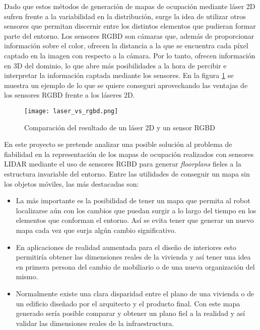 Dado que estos métodos de generación de mapas de ocupación mediante láser 2D sufren frente a la variabilidad en la distribución, surge la idea de utilizar otros sensores que permitan discernir entre los distintos elementos que pudieran formar parte del entorno. Los sensores RGBD son cámaras que, además de proporcionar información sobre el color, ofrecen la distancia a la que se encuentra cada píxel captado en la imagen con respecto a la cámara. Por lo tanto, ofrecen información en 3D del dominio, lo que abre más posibilidades a la hora de percibir e interpretar la información captada mediante los sensores. En la figura \ref{fig:laser_vs_rgbd} se muestra un ejemplo de lo que se quiere conseguri aprovechando las ventajas de los sensores RGBD frente a los láseres 2D.\\

\begin{figure}[H]
	\begin{center} 
	\texttt{[image: laser\_vs\_rgbd.png]}
	\end{center}
	\caption{Comparación del resultado de un láser 2D y un sensor RGBD}
	\label{fig:laser_vs_rgbd}
\end{figure}

En este proyecto se pretende analizar una posible solución al problema de fiabilidad en la representación de los mapas de ocupación realizados con sensores LIDAR mediante el uso de sensores RGBD para generar \textit{floorplans} fieles a la estructura invariable del entorno. Entre las utilidades de conseguir un mapa sin los objetos móviles, las más destacadas son:

\begin{itemize}

	\item La más importante es la posibilidad de tener un mapa que permita al robot localizarse aún con los cambios que puedan surgir a lo largo del tiempo en los elementos que conforman el entorno. Así se evita tener que generar un nuevo mapa cada vez que surja algún cambio significativo.
	\item En aplicaciones de realidad aumentada para el diseño de interiores esto permitiría obtener las dimensiones reales de la vivienda y así tener una idea en primera persona del cambio de mobiliario o de una nueva organización del mismo.
	\item Normalmente existe una clara disparidad entre el plano de una vivienda o de un edificio diseñado por el arquitecto y el producto final. Con este mapa generado sería posible comparar y obtener un plano fiel a la realidad y así validar las dimensiones reales de la infraestructura.

\end{itemize}



